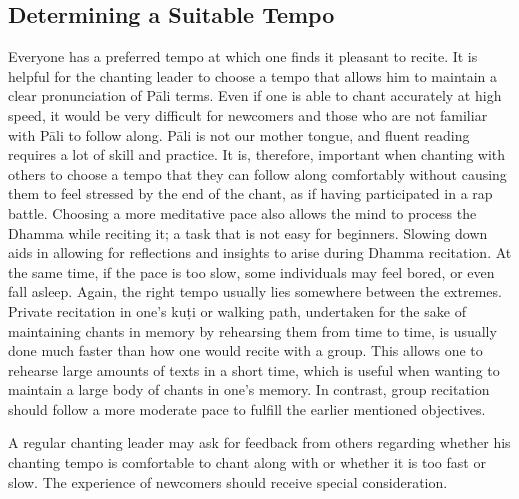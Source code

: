 \subsection*{Determining a Suitable Tempo}
\begin{justify}
  Everyone has a preferred tempo at which one finds it pleasant to recite. It is helpful for the chanting leader to choose a tempo that allows him to maintain a clear pronunciation of Pāli terms. Even if one is able to chant accurately at high speed, it would be very difficult for newcomers and those who are not familiar with Pāli to follow along. Pāli is not our mother tongue, and fluent reading requires a lot of skill and practice. It is, therefore, important when chanting with others to choose a tempo that they can follow along comfortably without causing them to feel stressed by the end of the chant, as if having participated in a rap battle. Choosing a more meditative pace also allows the mind to process the Dhamma while reciting it; a task that is not easy for beginners. Slowing down aids in allowing for reflections and insights to arise during Dhamma recitation. At the same time, if the pace is too slow, some individuals may feel bored, or even fall asleep. Again, the right tempo usually lies somewhere between the extremes. Private recitation in one's kuṭi or walking path, undertaken for the sake of maintaining chants in memory by rehearsing them from time to time, is usually done much faster than how one would recite with a group. This allows one to rehearse large amounts of texts in a short time, which is useful when wanting to maintain a large body of chants in one's memory. In contrast, group recitation should follow a more moderate pace to fulfill the earlier mentioned objectives.

  A regular chanting leader may ask for feedback from others regarding whether his chanting tempo is comfortable to chant along with or whether it is too fast or slow. The experience of newcomers should receive special consideration.
\end{justify}

